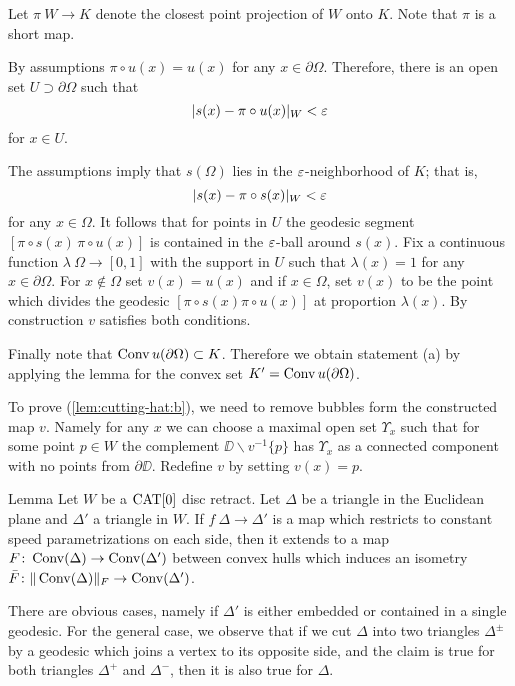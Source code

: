 \documentclass{article}
\begin{document}
Let $\pi\:W\to K$ denote the closest point projection of $W$ onto $K$.
Note that $\pi$
is a short map.

By assumptions $\pi\circ u(x)=u(x)$ for any $x\in\partial\Omega$.
Therefore, there is an open set $U\supset\partial \Omega$ such that 
$$|s(x)-\pi\circ u(x)|_W<\varepsilon$$ 
for $x\in U$.

The assumptions imply that $s(\Omega)$ lies in the $\varepsilon$-neighborhood of $K$;
that is, 
\[|s(x)-\pi\circ s(x)|_W<\varepsilon\] 
for any $x\in\Omega$.
It follows that for points in $U$ the geodesic segment $[\pi{\circ}s(x)\,\pi{\circ}u(x)]$ is contained in the $\varepsilon$-ball
around $s(x)$.
Fix a continuous function $\lambda\:\Omega\to [0,1]$
with the support in $U$
such that  $\lambda(x)=1$ for any $x\in \partial \Omega$.
For $x\notin \Omega$ set $v(x)=u(x)$ and if 
$x\in \Omega$, set $v(x)$ to be the point which divides the geodesic $[\pi\circ s(x)\pi\circ u(x)]$
at proportion $\lambda(x)$.
By construction $v$ satisfies both conditions.

Finally note that $\mathop{\rm Conv}\nolimits u(\partial\Omega)\subset K$. 
Therefore we obtain statement (a) 
by applying the lemma for the convex set $K'=\mathop{\rm Conv}\nolimits u(\partial\Omega)$.

To prove (\ref{lem:cutting-hat:b}), we need to remove bubbles form the constructed map $v$.
Namely for any $x$ we can choose a maximal open set $\Upsilon_x$ such that for some point $p\in W$ the complement $\DD\backslash v^{-1}\{p\}$ has $\Upsilon_x$ as a
connected component with no points from $\partial \DD$.
Redefine $v$ by setting $v(x)=p$.
\qeds

\begin{thm}{Lemma}\label{lem:isomtri}
Let $W$ be a $\mathop{\rm CAT}\nolimits[0]$ disc retract. 
Let $\Delta$ be a triangle in the Euclidean plane
and $\Delta'$ a triangle in $W$. 
If $f\:\Delta\to \Delta'$ is a map which restricts to constant speed
parametrizations on each side, then it extends to a map 
$F\colon\mathop{\rm Conv}\nolimits(\Delta)\to \mathop{\rm Conv}\nolimits(\Delta')$ between convex hulls which induces an isometry $\bar F\colon\|\mathop{\rm Conv}\nolimits(\Delta)\|_F\to \mathop{\rm Conv}\nolimits(\Delta')$. 
\end{thm}

There are obvious cases, namely if $\Delta'$ is either embedded or contained in a single geodesic. 
For the general case, we observe that if we cut $\Delta$ into two triangles $\Delta^\pm$ by a geodesic which joins a vertex to its opposite side, and  
the claim is true for both triangles $\Delta^+$ and $\Delta^-$, then it is also true for $\Delta$. 
\end{document}
